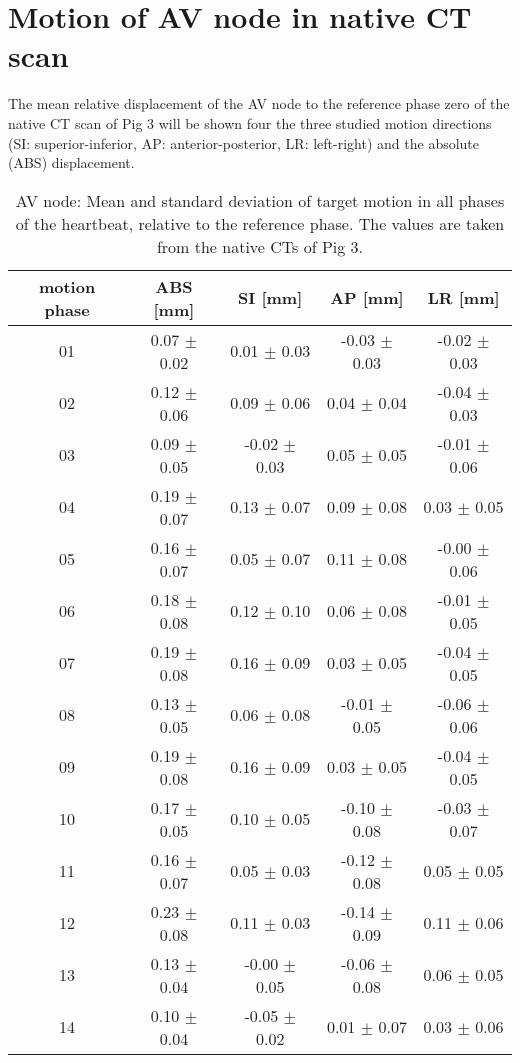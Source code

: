 \newpage

\section{Motion of AV node in native CT scan}

The mean relative displacement of the AV node to the reference phase zero of the native CT scan of Pig 3 will be shown four the three studied 
motion directions (SI: superior-inferior, AP: anterior-posterior, LR: left-right) and the absolute (ABS) displacement.

\begin{table}[H]
  \centering
  \scriptsize
  \caption{AV node: Mean and standard deviation of target motion in all phases of the heartbeat, relative to the reference phase. The values are 
  taken from the native CTs of Pig 3.}
  \begin{tabular}{|c|c|c|c|c|}
    \hline\hline
    motion phase\rule{0pt}{2.6ex}\rule[-1.2ex]{0pt}{0pt} & ABS [mm] & SI [mm] & AP [mm] & LR [mm]\\
    \hline
01&0.07 $\pm$ 0.02 &0.01 $\pm$ 0.03 &-0.03 $\pm$ 0.03 &-0.02 $\pm$ 0.03 \\
02&0.12 $\pm$ 0.06 &0.09 $\pm$ 0.06 &0.04 $\pm$ 0.04 &-0.04 $\pm$ 0.03 \\
03&0.09 $\pm$ 0.05 &-0.02 $\pm$ 0.03 &0.05 $\pm$ 0.05 &-0.01 $\pm$ 0.06 \\
04&0.19 $\pm$ 0.07 &0.13 $\pm$ 0.07 &0.09 $\pm$ 0.08 &0.03 $\pm$ 0.05 \\
05&0.16 $\pm$ 0.07 &0.05 $\pm$ 0.07 &0.11 $\pm$ 0.08 &-0.00 $\pm$ 0.06 \\
06&0.18 $\pm$ 0.08 &0.12 $\pm$ 0.10 &0.06 $\pm$ 0.08 &-0.01 $\pm$ 0.05 \\
07&0.19 $\pm$ 0.08 &0.16 $\pm$ 0.09 &0.03 $\pm$ 0.05 &-0.04 $\pm$ 0.05 \\
08&0.13 $\pm$ 0.05 &0.06 $\pm$ 0.08 &-0.01 $\pm$ 0.05 &-0.06 $\pm$ 0.06 \\
09&0.19 $\pm$ 0.08 &0.16 $\pm$ 0.09 &0.03 $\pm$ 0.05 &-0.04 $\pm$ 0.05 \\
10&0.17 $\pm$ 0.05 &0.10 $\pm$ 0.05 &-0.10 $\pm$ 0.08 &-0.03 $\pm$ 0.07 \\
11&0.16 $\pm$ 0.07 &0.05 $\pm$ 0.03 &-0.12 $\pm$ 0.08 &0.05 $\pm$ 0.05 \\
12&0.23 $\pm$ 0.08 &0.11 $\pm$ 0.03 &-0.14 $\pm$ 0.09 &0.11 $\pm$ 0.06 \\
13&0.13 $\pm$ 0.04 &-0.00 $\pm$ 0.05 &-0.06 $\pm$ 0.08 &0.06 $\pm$ 0.05 \\
14&0.10 $\pm$ 0.04 &-0.05 $\pm$ 0.02 &0.01 $\pm$ 0.07 &0.03 $\pm$ 0.06 \\

\end{tabular}
\end{table}
